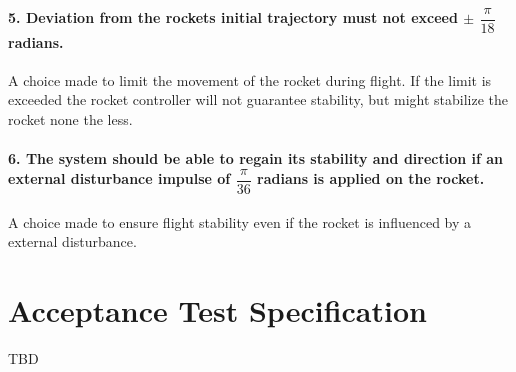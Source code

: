 \paragraph{5. Deviation from the rockets initial trajectory must not exceed $\pm$ $\dfrac{\pi}{18}$ radians.} 

\forceindent A choice made to limit the movement of the rocket during flight. If the limit is exceeded the rocket controller will not guarantee stability, but might stabilize the rocket none the less.      

\paragraph{6. The system should be able to regain its stability and direction if an external disturbance impulse of $\dfrac{\pi}{36}$ radians is applied on the rocket.}  

\forceindent  A choice made to ensure flight stability even if the rocket is influenced by a external disturbance.

\section{Acceptance Test Specification}	
TBD